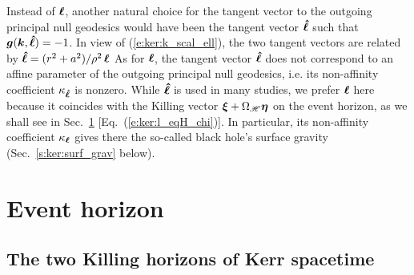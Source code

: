 \begin{remark}
Instead of $\bm{\ell}$, another natural choice for the tangent vector to the outgoing
principal null geodesics
would have been the tangent vector $\bm{\hat{\ell}}$
such that $\bm{g}(\bm{k}, \bm{\hat{\ell}}) = - 1$.
In view of (\ref{e:ker:k_scal_ell}), the two tangent vectors are related by
$\bm{\hat{\ell}} = (r^2 + a^2)/\rho^2\,  \bm{\ell}$
As for $\bm{\ell}$, the tangent vector $\bm{\hat{\ell}}$ does not correspond to
an affine parameter of the outgoing
principal null geodesics, i.e. its
non-affinity coefficient $\kappa_{\bm{\hat{\ell}}}$ is nonzero. While
$\bm{\hat{\ell}}$ is used in many studies, we prefer $\bm{\ell}$ here because it
coincides with the Killing vector $\bm{\xi} + \Omega_{\mathscr{H}} \bm{\eta}$
on the event horizon, as we shall see in Sec.~\ref{s:ker:event_hor_gen}
[Eq.~(\ref{e:ker:l_eqH_chi})]. In particular, its
non-affinity coefficient $\kappa_{\bm{\ell}}$ gives there the so-called
black hole's surface gravity (Sec.~\ref{s:ker:surf_grav} below).
\end{remark}





\section{Event horizon} \label{s:ker:event_hor_gen}

\subsection{The two Killing horizons of Kerr spacetime} \label{s:ker:Killing_hor}

